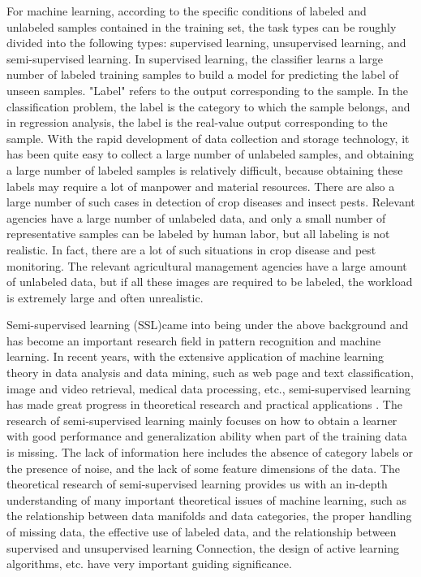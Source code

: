 \documentclass[11pt,en]{elegantpaper}
\begin{document}
For machine learning, according to the specific conditions of labeled and unlabeled samples contained in the training set, the task types can be roughly divided into the following types: supervised learning, unsupervised learning, and semi-supervised learning. In supervised learning, the classifier learns a large number of labeled training samples to build a model for predicting the label of unseen samples. "Label" refers to the output corresponding to the sample. In the classification problem, the label is the category to which the sample belongs, and in regression analysis, the label is the real-value output corresponding to the sample. With the rapid development of data collection and storage technology, it has been quite easy to collect a large number of unlabeled samples, and obtaining a large number of labeled samples is relatively difficult, because obtaining these labels may require a lot of manpower and material resources. There are also a large number of such cases in detection of crop diseases and insect pests. Relevant agencies have a large number of unlabeled data, and only a small number of representative samples can be labeled by human labor, but all labeling is not realistic. In fact, there are a lot of such situations in crop disease and pest monitoring. The relevant agricultural management agencies have a large amount of unlabeled data, but if all these images are required to be labeled, the workload is extremely large and often unrealistic.

Semi-supervised learning (SSL)\cite{rasmus2015semisupervised}came into being under the above background and has become an important research field in pattern recognition and machine learning. In recent years, with the extensive application of machine learning theory in data analysis and data mining, such as web page and text classification, image and video retrieval, medical data processing, etc., semi-supervised learning has made great progress in theoretical research and practical applications . The research of semi-supervised learning mainly focuses on how to obtain a learner with good performance and generalization ability when part of the training data is missing. The lack of information here includes the absence of category labels or the presence of noise, and the lack of some feature dimensions of the data. The theoretical research of semi-supervised learning provides us with an in-depth understanding of many important theoretical issues of machine learning, such as the relationship between data manifolds and data categories, the proper handling of missing data, the effective use of labeled data, and the relationship between supervised and unsupervised learning Connection, the design of active learning algorithms, etc. have very important guiding significance.
\end{document}
